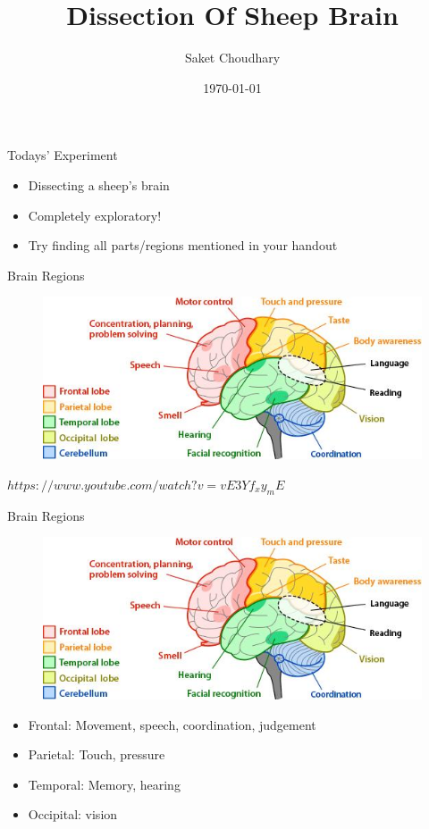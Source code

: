\documentclass[10pt]{beamer}
\title{Dissection Of Sheep Brain}
\date{\today}
\author{Saket Choudhary}
\institute{BISC 104\\Session 5}
\begin{document}
\maketitle

\begin{frame}{Todays' Experiment}
\begin{itemize}[<+-| alert@+>]
\item Dissecting a sheep's brain
\item Completely exploratory!
\item Try finding all parts/regions mentioned in your handout
\end{itemize}

\end{frame}

\begin{frame}[fragile]{Brain Regions}
\begin{figure}
\includegraphics[width=\linewidth]{brain.jpg}
\end{figure}
$https://www.youtube.com/watch?v=vE3Yf_xy_mE$
\end{frame}

\begin{frame}[fragile]{Brain Regions}
\begin{figure}
\includegraphics[width=0.5\linewidth]{brain.jpg}
\end{figure}
\begin{itemize}[<+-| alert@+>]
\item Frontal: Movement, speech, coordination, judgement
\item Parietal: Touch, pressure
\item Temporal: Memory, hearing
\item Occipital: vision
\end{itemize}
\end{frame}
\end{document}
